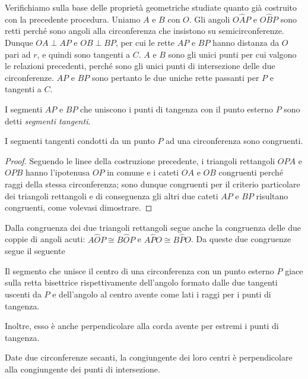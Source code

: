 Verifichiamo sulla base delle proprietà geometriche studiate quanto già 
costruito con la precedente procedura.
Uniamo \(A\) e \(B\) con \(O\). Gli angoli \(O\widehat{A}P\) e \(O\widehat{B}P\) sono 
retti perché sono angoli alla circonferenza che 
insistono su semicirconferenze. Dunque \(OA\perp AP\) e \(OB\perp BP\), 
per cui le rette \(AP\) e \(BP\) hanno distanza da \(O\) pari ad \(r\), e 
quindi sono tangenti a \(C\). \(A\) e \(B\) sono gli unici punti per cui 
valgono le relazioni precedenti, perché sono gli unici punti di 
intersezione delle due circonferenze. \(AP\) e \(BP\) sono pertanto le 
due uniche rette passanti per \(P\) e tangenti a \(C\).

I segmenti \(AP\) e \(BP\) che uniscono i punti di tangenza con il punto 
esterno \(P\) sono detti \emph{segmenti tangenti}.

\begin{teorema}
I segmenti tangenti condotti da un punto \(P\) ad una circonferenza 
sono congruenti.
\end{teorema}

\begin{proof}
Seguendo le linee della costruzione precedente, i triangoli 
rettangoli \(OPA\) e \(OPB\) hanno l'ipotenusa \(OP\) in comune e i cateti 
\(OA\) e \(OB\) congruenti perché raggi della stessa circonferenza; sono 
dunque congruenti per il criterio particolare dei triangoli 
rettangoli e di conseguenza gli altri due cateti \(AP\) e \(BP\) 
risultano congruenti, come volevasi dimostrare.
\end{proof}

Dalla congruenza dei due triangoli rettangoli segue anche la 
congruenza delle due coppie di angoli acuti: \(A\widehat{O}P\cong 
B\widehat{O}P\) e \(A\widehat{P}O\cong B\widehat{P}O\). Da queste due 
congruenze segue il seguente 
\begin{corollario}\label{cor:5.1}
Il segmento che unisce il centro di una circonferenza con un punto 
esterno \(P\) giace sulla retta bisettrice rispettivamente dell'angolo formato dalle due tangenti 
uscenti da \(P\) e dell'angolo al centro avente come lati i raggi per 
i punti di tangenza.
\end{corollario}
Inoltre, esso è anche perpendicolare alla corda avente per estremi i 
punti di tangenza.

\begin{corollario}
Date due circonferenze secanti, la congiungente dei loro centri è 
perpendicolare alla congiungente dei punti di intersezione.
\end{corollario}

